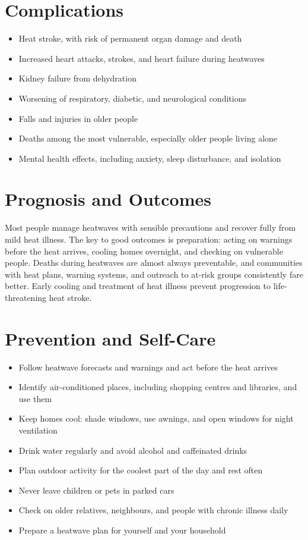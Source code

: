 \section*{Complications}
\begin{itemize}
    \item Heat stroke, with risk of permanent organ damage and death
    \item Increased heart attacks, strokes, and heart failure during heatwaves
    \item Kidney failure from dehydration
    \item Worsening of respiratory, diabetic, and neurological conditions
    \item Falls and injuries in older people
    \item Deaths among the most vulnerable, especially older people living alone
    \item Mental health effects, including anxiety, sleep disturbance, and isolation
\end{itemize}

\section*{Prognosis and Outcomes}
Most people manage heatwaves with sensible precautions and recover fully from mild heat illness. The key to good outcomes is preparation: acting on warnings before the heat arrives, cooling homes overnight, and checking on vulnerable people. Deaths during heatwaves are almost always preventable, and communities with heat plans, warning systems, and outreach to at-risk groups consistently fare better. Early cooling and treatment of heat illness prevent progression to life-threatening heat stroke.

\section*{Prevention and Self-Care}
\begin{itemize}
    \item Follow heatwave forecasts and warnings and act before the heat arrives
    \item Identify air-conditioned places, including shopping centres and libraries, and use them
    \item Keep homes cool: shade windows, use awnings, and open windows for night ventilation
    \item Drink water regularly and avoid alcohol and caffeinated drinks
    \item Plan outdoor activity for the coolest part of the day and rest often
    \item Never leave children or pets in parked cars
    \item Check on older relatives, neighbours, and people with chronic illness daily
    \item Prepare a heatwave plan for yourself and your household
\end{itemize}

